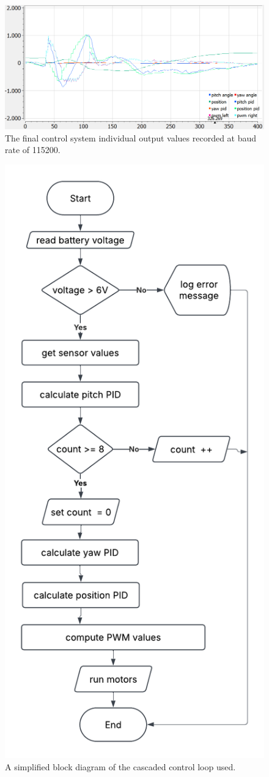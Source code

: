 \begin{figure}[h]
	\centering
	\includegraphics[width=0.8\linewidth]{assets/final_pid.png}
	\caption{The final control system individual output values recorded at baud rate of 115200.}
	\label{fig:final_pid}
\end{figure}

\begin{figure}[h]
	\centering
	\includegraphics[width=0.5\linewidth]{assets/control_loop_diagram.png}
	\caption{A simplified block diagram of the cascaded control loop used. }
	\label{fig:control-loop-2}
\end{figure}
